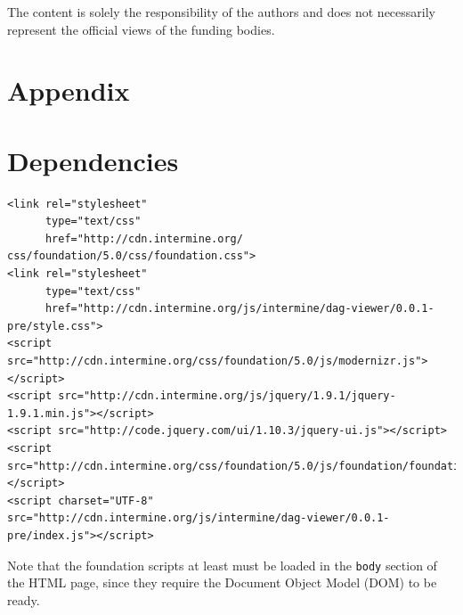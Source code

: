 \documentclass[10pt,a4paper,twocolumn]{article}
\begin{document}
The content is solely the responsibility of the authors and does not necessarily
represent the official views of the funding bodies.

\nocite{*}
{\small
}

\clearpage
\section*{Appendix}
\appendix

\section{Dependencies}
\label{sec:deps}

\lstset{language=HTML}
\begin{lstlisting}
<link rel="stylesheet"
      type="text/css"
      href="http://cdn.intermine.org/
css/foundation/5.0/css/foundation.css">
<link rel="stylesheet"
      type="text/css"
      href="http://cdn.intermine.org/js/intermine/dag-viewer/0.0.1-pre/style.css">
<script src="http://cdn.intermine.org/css/foundation/5.0/js/modernizr.js"></script>
<script src="http://cdn.intermine.org/js/jquery/1.9.1/jquery-1.9.1.min.js"></script>
<script src="http://code.jquery.com/ui/1.10.3/jquery-ui.js"></script>
<script src="http://cdn.intermine.org/css/foundation/5.0/js/foundation/foundation.js"></script>
<script charset="UTF-8" src="http://cdn.intermine.org/js/intermine/dag-viewer/0.0.1-pre/index.js"></script>
\end{lstlisting}

Note that the foundation scripts at least must be loaded in the
\texttt{body} section of the HTML page, since they require the
Document Object Model (DOM) to be ready.



\end{document}
